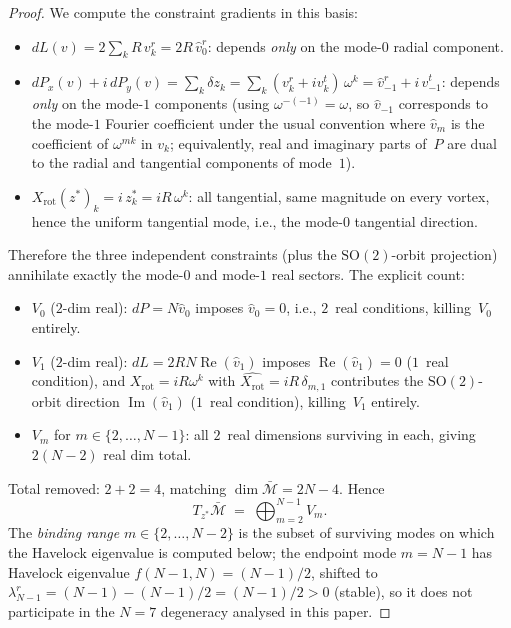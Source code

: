 \begin{proof}
We compute the constraint gradients in this basis:
\begin{itemize}[leftmargin=*,topsep=0pt,itemsep=0pt]
\item $dL(v) = 2\sum_k R\, v_k^r = 2R\,\hat v^r_0$:
  depends \emph{only} on the mode-$0$ radial component.
\item $dP_x(v) + i\,dP_y(v) = \sum_k \delta z_k
  = \sum_k (v_k^r + i v_k^t)\,\omega^k = \hat v^r_{-1}
  + i\,\hat v^t_{-1}$: depends \emph{only} on the mode-$1$
  components (using $\omega^{-(-1)} = \omega$, so
  $\hat v_{-1}$ corresponds to the mode-$1$ Fourier coefficient
  under the usual convention where $\hat v_m$ is the coefficient
  of $\omega^{mk}$ in $v_k$; equivalently, real and imaginary
  parts of~$P$ are dual to the radial and tangential
  components of mode~$1$).
\item $X_{\mathrm{rot}}(z^*)_k = i\,z_k^* = i R\,\omega^k$:
  all tangential, same magnitude on every vortex, hence
  the uniform tangential mode, i.e., the mode-$0$ tangential
  direction.
\end{itemize}

Therefore the three independent constraints (plus the
$\mathrm{SO}(2)$-orbit projection) annihilate exactly the
mode-$0$ and mode-$1$ real sectors.  The explicit count:
\begin{itemize}[leftmargin=*,topsep=0pt,itemsep=0pt]
\item $V_0$ ($2$-dim real): $dP = N\hat v_0$ imposes
  $\hat v_0 = 0$, i.e., $2$~real conditions, killing~$V_0$
  entirely.
\item $V_1$ ($2$-dim real): $dL = 2RN\operatorname{Re}(\hat v_1)$
  imposes $\operatorname{Re}(\hat v_1) = 0$ ($1$~real condition),
  and $X_{\mathrm{rot}} = iR\omega^k$ with
  $\widehat{X_{\mathrm{rot}}} = iR\,\delta_{m,1}$ contributes
  the $\mathrm{SO}(2)$-orbit direction $\operatorname{Im}(\hat v_1)$
  ($1$~real condition), killing~$V_1$ entirely.
\item $V_m$ for $m \in \{2, \ldots, N-1\}$: all $2$~real
  dimensions surviving in each, giving $2(N-2)$ real dim total.
\end{itemize}
Total removed: $2 + 2 = 4$, matching $\dim\bar{\mathcal{M}} =
2N - 4$.  Hence
\begin{equation}\label{eq:mode-decomp}
  T_{z^*}\bar{\mathcal{M}}
  \;=\; \bigoplus_{m = 2}^{N-1} V_m.
\end{equation}
The \emph{binding range} $m \in \{2, \ldots, N-2\}$ is the
subset of surviving modes on which the Havelock eigenvalue is
computed below; the endpoint mode $m = N-1$ has Havelock
eigenvalue $f(N-1, N) = (N-1)/2$, shifted to $\lambda_{N-1}^r
= (N-1) - (N-1)/2 = (N-1)/2 > 0$ (stable), so it does not
participate in the $N = 7$ degeneracy analysed in this paper.


\end{proof}
